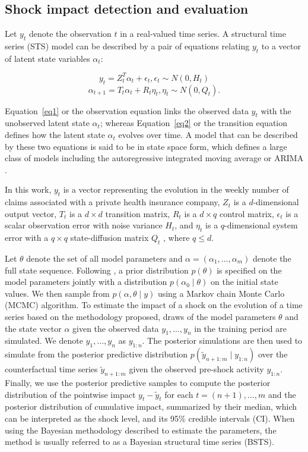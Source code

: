 \documentclass[]{risa}
\begin{document}
\subsection{Shock impact detection and evaluation}\label{methodsBSTS}
Let $y_t$ denote the observation $t$ in a real-valued time series. A structural time series (STS) model can be described by a pair of equations relating $y_t$ to a vector of latent state variables $\alpha_t$:

\begin{equation}\label{eq1}
y_t = Z_t^T \alpha_t + \epsilon_t, \epsilon_t \sim N(0, H_t)
\end{equation}
\begin{equation}\label{eq2}
\alpha_{t+1} = T_t \alpha_t + R_t \eta_t, \eta_t \sim N(0, Q_t).
\end{equation}

Equation~\ref{eq1} or the observation equation links the observed data $y_t$ with the unobserved latent state $\alpha_t$; whereas Equation~\ref{eq2} or the transition equation defines how the latent state $\alpha_t$ evolves over time. A model that can be described by these two equations is said to be in state space form, which defines a large class of models including the autoregressive integrated moving average or ARIMA \cite{scott_predicting_nodate}. 

In this work, $y_t$ is a vector representing the evolution in the weekly number of claims associated with a private health insurance company, $Z_t$ is a $d$-dimensional output vector, $T_t$ is a $d \times d$ transition matrix, $R_t$ is a $d \times q$ control matrix, $\epsilon_t$ is a scalar observation error with noise variance $H_t$, and $\eta_t$ is a $q$-dimensional system error with a $q \times q$ state-diffusion matrix $Q_t$ , where $q \leq d$. 

Let $\theta$ denote the set of all model parameters and $\alpha = (\alpha_1, \ldots, \alpha_m)$ denote the full state sequence. Following \cite{brodersen_inferring_2015}, a prior distribution $p(\theta)$ is specified on the model parameters jointly with a distribution $p(\alpha_0 \mid \theta)$ on the initial state values. We then sample from $p(\alpha, \theta \mid y)$ using a Markov chain Monte Carlo (MCMC) algorithm. To estimate the impact of a shock on the evolution of a time series based on the methodology proposed, draws of the model parameters $\theta$ and the state vector $\alpha$ given the observed data $y_1, \ldots, y_n$ in the training period are simulated. We denote $y_1, \ldots, y_n$ as  $y_{1:n}$. The posterior simulations are then used to simulate from the posterior predictive distribution $p(\tilde{y}_{n+1:m} \mid y_{1:n})$ over the counterfactual time series $\tilde{y}_{n+1:m}$ given the observed pre-shock activity $y_{1:n}$. Finally, we use the posterior predictive samples to compute the posterior distribution of the pointwise impact $y_t - \tilde{y}_t$ for each $t=(n+1), \ldots, m$ and the posterior distribution of cumulative impact, summarized by their median,  which can be interpreted as the shock level, and its 95\% credible intervals (CI). When using the Bayesian methodology described to estimate the parameters, the method is usually referred to as a Bayesian structural time series (BSTS).
\end{document}
